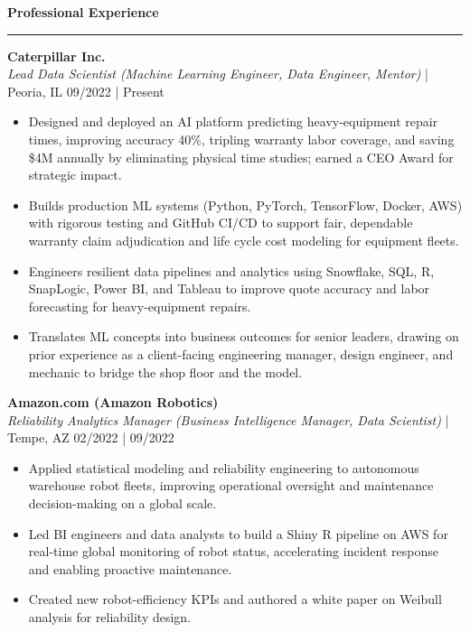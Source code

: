 \documentclass[10pt, letterpaper, sans]{article}
\newcommand{\sectionheader}[1]{%
 \vspace{11pt}%
 \par\noindent\textbf{\Large #1}\par\hrule\vspace{5pt}%
}
\begin{document}
\sectionheader{Professional Experience}
\textbf{Caterpillar Inc.} \\
\textit{Lead Data Scientist (Machine Learning Engineer, Data Engineer, Mentor)} | Peoria, IL \hfill 09/2022 | Present

\begin{itemize}

    \item Designed and deployed an AI platform predicting heavy-equipment repair times, improving accuracy 40\%, tripling warranty labor coverage, and saving \$4M annually by eliminating physical time studies; earned a CEO Award for strategic impact.
    
    \item Builds production ML systems (Python, PyTorch, TensorFlow, Docker, AWS) with rigorous testing and GitHub CI/CD to support fair, dependable warranty claim adjudication and life cycle cost modeling for equipment fleets.
    
    \item Engineers resilient data pipelines and analytics using Snowflake, SQL, R, SnapLogic, Power BI, and Tableau to improve quote accuracy and labor forecasting for heavy-equipment repairs.
    
    \item Translates ML concepts into business outcomes for senior leaders, drawing on prior experience as a client-facing engineering manager, design engineer, and mechanic to bridge the shop floor and the model.

\end{itemize}


\textbf{Amazon.com (Amazon Robotics)} \\
\textit{Reliability Analytics Manager (Business Intelligence Manager, Data Scientist)} | Tempe, AZ \hfill 02/2022 | 09/2022

\begin{itemize}

    \item Applied statistical modeling and reliability engineering to autonomous warehouse robot fleets, improving operational oversight and maintenance decision-making on a global scale.
    
    \item Led BI engineers and data analysts to build a Shiny R pipeline on AWS for real-time global monitoring of robot status, accelerating incident response and enabling proactive maintenance.
    
    \item Created new robot-efficiency KPIs and authored a white paper on Weibull analysis for reliability design.
    

\end{itemize}
\end{document}
